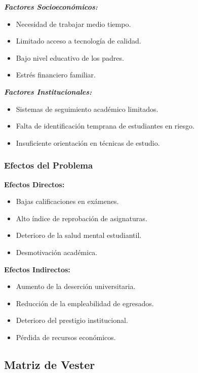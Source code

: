 \documentclass[12pt,letterpaper]{report}
\begin{document}
\textbf{\textit{Factores Socioeconómicos:}}
\vspace{0.1cm}
\begin{itemize}
    \item Necesidad de trabajar medio tiempo.
    \item Limitado acceso a tecnología de calidad.
    \item Bajo nivel educativo de los padres.
    \item Estrés financiero familiar.
\end{itemize}

\textbf{\textit{Factores Institucionales:}}
\vspace{0.1cm}
\begin{itemize}
    \item Sistemas de seguimiento académico limitados.
    \item Falta de identificación temprana de estudiantes en riesgo.
    \item Insuficiente orientación en técnicas de estudio.
\end{itemize}

\subsubsection{Efectos del Problema}

\textbf{Efectos Directos:}
\vspace{0.1cm}
\begin{itemize}
    \item Bajas calificaciones en exámenes.
    \item Alto índice de reprobación de asignaturas.
    \item Deterioro de la salud mental estudiantil.
    \item Desmotivación académica.
\end{itemize}

\textbf{Efectos Indirectos:}
\vspace{0.1cm}
\begin{itemize}
    \item Aumento de la deserción universitaria.
    \item Reducción de la empleabilidad de egresados.
    \item Deterioro del prestigio institucional.
    \item Pérdida de recursos económicos.
\end{itemize}

\subsection{Matriz de Vester}
\end{document}
